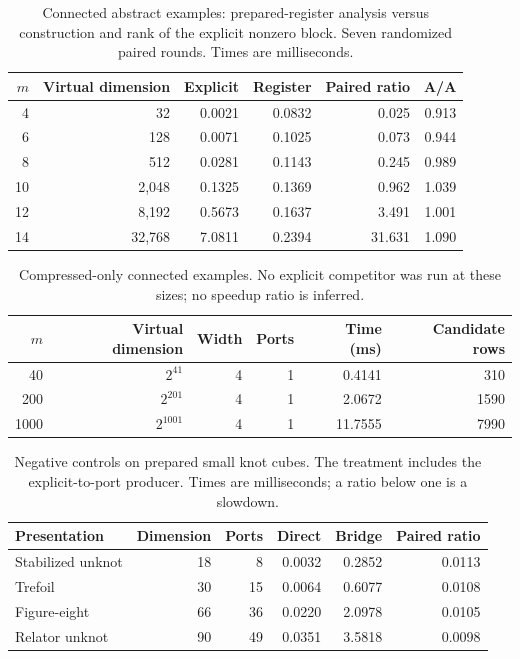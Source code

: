 \begin{table}[htbp]
\centering
\caption{Connected abstract examples: prepared-register analysis versus construction and rank of the explicit nonzero block. Seven randomized paired rounds. Times are milliseconds.}
\label{tab:abstract}
\begin{tabular}{rrrrrr}
\toprule
$m$ & Virtual dimension & Explicit & Register & Paired ratio & A/A \\
\midrule
4 & 32 & 0.0021 & 0.0832 & 0.025 & 0.913 \\
6 & 128 & 0.0071 & 0.1025 & 0.073 & 0.944 \\
8 & 512 & 0.0281 & 0.1143 & 0.245 & 0.989 \\
10 & 2,048 & 0.1325 & 0.1369 & 0.962 & 1.039 \\
12 & 8,192 & 0.5673 & 0.1637 & 3.491 & 1.001 \\
14 & 32,768 & 7.0811 & 0.2394 & 31.631 & 1.090 \\
\bottomrule
\end{tabular}
\end{table}
\begin{table}[htbp]
\centering
\caption{Compressed-only connected examples. No explicit competitor was run at these sizes; no speedup ratio is inferred.}
\label{tab:huge}
\begin{tabular}{rrrrrr}
\toprule
$m$ & Virtual dimension & Width & Ports & Time (ms) & Candidate rows \\
\midrule
40 & $2^{41}$ & 4 & 1 & 0.4141 & 310 \\
200 & $2^{201}$ & 4 & 1 & 2.0672 & 1590 \\
1000 & $2^{1001}$ & 4 & 1 & 11.7555 & 7990 \\
\bottomrule
\end{tabular}
\end{table}
\begin{table}[htbp]
\centering
\caption{Negative controls on prepared small knot cubes. The treatment includes the explicit-to-port producer. Times are milliseconds; a ratio below one is a slowdown.}
\label{tab:cubes}
\begin{tabular}{lrrrrr}
\toprule
Presentation & Dimension & Ports & Direct & Bridge & Paired ratio \\
\midrule
Stabilized unknot & 18 & 8 & 0.0032 & 0.2852 & 0.0113 \\
Trefoil & 30 & 15 & 0.0064 & 0.6077 & 0.0108 \\
Figure-eight & 66 & 36 & 0.0220 & 2.0978 & 0.0105 \\
Relator unknot & 90 & 49 & 0.0351 & 3.5818 & 0.0098 \\
\bottomrule
\end{tabular}
\end{table}
\newcommand{\SlowFour}{39.5}
\newcommand{\GainTen}{0.962}
\newcommand{\GainTwelve}{3.49}
\newcommand{\GainFourteen}{31.63}
